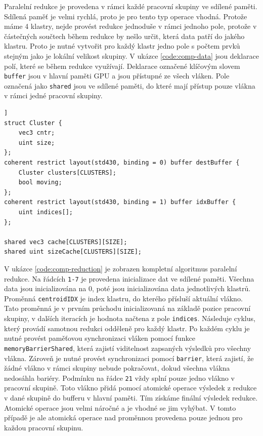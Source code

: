 \documentclass[11pt,twoside,a4paper]{book}
\begin{document}
Paralelní redukce je provedena v rámci každé pracovní skupiny ve sdílené paměti. Sdílená paměť je velmi rychlá, proto je pro tento typ operace vhodná. Protože máme 4 klastry, nejde provést redukce jednoduše v rámci jednoho pole, protože v částečných součtech během redukce by nešlo určit, která data patří do jakého klastru. Proto je nutné vytvořit pro každý klastr jedno pole s počtem prvků stejným jako je lokální velikost skupiny. V ukázce \ref{code:comp-data} jsou deklarace polí, které se během redukce využívají. Deklarace označené klíčovým slovem \texttt{buffer} jsou v hlavní paměti GPU a jsou přístupné ze všech vláken. Pole označená jako \texttt{shared} jsou ve sdílené paměti, do které mají přístup pouze vlákna v rámci jedné pracovní skupiny.


\begin{lstlisting}[caption={Datové struktury potřebné pro sečtení normál pomocí paralelní redukce.},label={code:comp-data},firstnumber=1,float=[ht]]
struct Cluster {
	vec3 cntr;
	uint size;
};
coherent restrict layout(std430, binding = 0) buffer destBuffer {
	Cluster clusters[CLUSTERS];
	bool moving;
};
coherent restrict layout(std430, binding = 1) buffer idxBuffer {
	uint indices[];
};

shared vec3 cache[CLUSTERS][SIZE];
shared uint sizeCache[CLUSTERS][SIZE];
\end{lstlisting}


V ukázce \ref{code:comp-reduction} je zobrazen kompletní algoritmus paralelní redukce. Na řádcích \texttt{1-7} je provedena inicializace dat ve sdílené paměti. Všechna data jsou inicializována na 0, poté jsou inicializována data jednotlivých klastrů. Proměnná \texttt{centroidIDX} je index klastru, do kterého přísluší aktuální vlákno. Tato proměnná je v prvním průchodu inicializovaná na základě pozice pracovní skupiny, v dalších iteracích je hodnota načtena z pole \texttt{indices}. Následuje cyklus, který provádí samotnou redukci odděleně pro každý klastr. Po každém cyklu je nutné provést paměťovou synchronizaci vláken pomocí funkce  \texttt{memoryBarrierShared}, která zajistí viditelnost zapsaných výsledků pro všechny vlákna. Zároveň je nutné provést synchronizaci pomocí \texttt{barrier}, která zajistí, že žádné vlákno v rámci skupiny nebude pokračovat, dokud všechna vlákna nedosáhla bariéry. Podmínku na řádce \texttt{21} vždy splní pouze jedno vlákno v pracovní skupině. Toto vlákno přidá pomocí atomické operace výsledek z redukce v dané skupině do bufferu v hlavní paměti. Tím získáme finální výsledek redukce. Atomické operace jsou velmi náročné a je vhodné se jim vyhýbat. V tomto případě je ale atomická operace nad proměnnou provedena pouze jednou pro každou pracovní skupinu.
\end{document}
